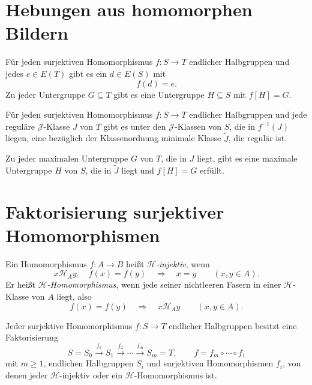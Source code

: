 \section{Hebungen aus homomorphen Bildern}

\begin{theorem}
Für jeden surjektiven Homomorphismus $f:S\to T$ endlicher Halbgruppen
und jedes $e\in E(T)$ gibt es ein $d\in E(S)$ mit
\[
 f(d)=e.
\]
Zu jeder Untergruppe $G\subseteq T$ gibt es eine Untergruppe
$H\subseteq S$ mit $f[H]=G$.
\cite{branco2020}
\end{theorem}

\begin{theorem}
\label{thm:b37-guide-rhodes-lifting}
Für jeden surjektiven Homomorphismus $f:S\to T$ endlicher Halbgruppen
und jede reguläre $\mathcal J$-Klasse $J$ von $T$ gibt es unter den
$\mathcal J$-Klassen von $S$, die in $f^{-1}(J)$ liegen, eine bezüglich
der Klassenordnung minimale Klasse $\widetilde J$, die regulär ist.

Zu jeder maximalen Untergruppe $G$ von $T$, die in $J$ liegt,
gibt es eine maximale Untergruppe $H$ von $S$, die in
$\widetilde J$ liegt und $f[H]=G$ erfüllt.
\cite[Proposition~3.11]{AlmeidaMargolisSteinbergVolkov2009}
\end{theorem}

\clearpage
\section{Faktorisierung surjektiver Homomorphismen}

\begin{definition}
Ein Homomorphismus $f:A\to B$ heißt \emph{$\mathcal H$-injektiv}, wenn
\[
 x\mathrel{\mathcal H_A}y,\quad f(x)=f(y)
 \quad\Longrightarrow\quad x=y
 \qquad(x,y\in A).
\]
Er heißt \emph{$\mathcal H$-Homomorphismus}, wenn jede seiner nichtleeren Fasern
in einer $\mathcal H$-Klasse von $A$ liegt, also
\[
 f(x)=f(y)\quad\Longrightarrow\quad x\mathrel{\mathcal H_A}y
 \qquad(x,y\in A).
\]
\end{definition}

\begin{theorem}
\label{thm:b37-guide-rhodes-factorization}
Jeder surjektive Homomorphismus $f:S\to T$ endlicher Halbgruppen
besitzt eine Faktorisierung
\[
 S=S_0\xrightarrow{f_1}S_1\xrightarrow{f_2}\cdots
 \xrightarrow{f_m}S_m=T,\qquad
 f=f_m\circ\cdots\circ f_1
\]
mit $m\geq1$, endlichen Halbgruppen $S_i$ und surjektiven
Homomorphismen $f_i$, von denen jeder $\mathcal H$-injektiv
oder ein $\mathcal H$-Homomorphismus ist.
\cite{Rhodes1967Homomorphism,Rhodes1970Survey}
\end{theorem}

